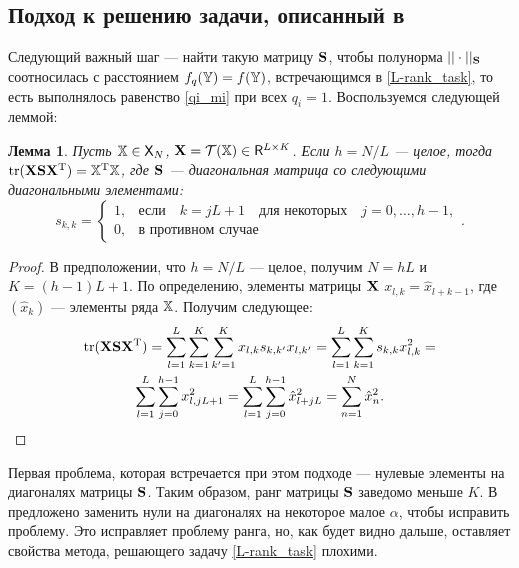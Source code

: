 \documentclass[12pt,a4paper,fleqn,leqno]{article}
\DeclareMathOperator{\tr}{tr}
\begin{document}
\subsection{Подход к решению задачи, описанный в \cite{Gillard2014}}
Следующий важный шаг --- найти такую матрицу $\mathbf{S}$, чтобы полунорма $||\cdot||_{\mathbf{S}}$ соотносилась с расстоянием $f_q(\mathbb{Y}) = f(\mathbb{Y})$, встречающимся в \eqref{L-rank_task}, то есть выполнялось равенство \eqref{qi_mi} при всех $q_i = 1$. Воспользуемся следующей леммой:
\newtheorem{lemma}{Лемма}
\begin{lemma}\label{zhiglemma}\cite{Gillard2014}
Пусть $\mathbb{X} \in \mathsf{X}_N$, $\mathbf{X} = \mathcal{T}(\mathbb{X}) \in \mathsf{R}^{L \times K}$. Если $h = N/L$ --- целое, тогда $\tr(\bfX \bfS \bfX^\rmT) = \tsX^\rmT \tsX$, где $\mathbf{S}$ --- диагональная матрица со следующими диагональными элементами:
\begin{equation*}
s_{k,k} = \begin{cases}
1, & \text{если} \quad k = jL+1 \quad \text{для некоторых} \quad j = 0, \ldots, h-1, \\
0, & \text{в противном случае}
\end{cases}.
\end{equation*}
\end{lemma}
\begin{proof}
В предположении, что $h = N/L$ --- целое, получим $N = hL$ и $K = (h - 1)L + 1$.
По определению, элементы матрицы $\mathbf{X}$ $x_{l,k} = \hat{x}_{l+k-1}$, где $(\hat{x}_k)$ --- элементы ряда $\mathbb{X}$. Получим следующее:
\begin{gather*}
\tr(\bfX \bfS \bfX^\rmT) = \sum_{l=1}^L \sum_{k=1}^K \sum_{k'=1}^K x_{l,k} s_{k, k'} x_{l,k'} = \sum_{l=1}^L \sum_{k=1}^K s_{k, k} x_{l,k}^2 =\\ \sum_{l=1}^L \sum_{j = 0}^{h - 1}x_{l,jL+1}^2 = \sum_{l=1}^L \sum_{j = 0}^{h - 1}\hat{x}_{l + jL}^2 = \sum_{n=1}^N \hat{x}_n^2.
\end{gather*}
\end{proof}

Первая проблема, которая встречается при этом подходе --- нулевые элементы на диагоналях матрицы $\mathbf{S}$. Таким образом, ранг матрицы $\mathbf{S}$ заведомо меньше $K$. В \cite{Gillard2014} предложено заменить нули на диагоналях на некоторое малое $\alpha$, чтобы исправить проблему. Это исправляет проблему ранга, но, как будет видно дальше, оставляет свойства метода, решающего задачу \eqref{L-rank_task} плохими.
\end{document}
